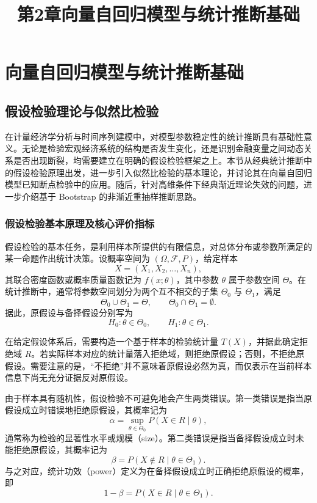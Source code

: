 \documentclass[UTF8,a4paper,12pt]{ctexbook}
\title{第2章\quad 向量自回归模型与统计推断基础}
\author{}
\date{}
\begin{document}
\maketitle

\setcounter{chapter}{1}
\chapter{向量自回归模型与统计推断基础}
\setcounter{section}{2}

\section{假设检验理论与似然比检验}

在计量经济学分析与时间序列建模中，对模型参数稳定性的统计推断具有基础性意义。无论是检验宏观经济系统的结构是否发生变化，还是识别金融变量之间动态关系是否出现断裂，均需要建立在明确的假设检验框架之上。本节从经典统计推断中的假设检验原理出发，进一步引入似然比检验的基本理论，并讨论其在向量自回归模型已知断点检验中的应用。随后，针对高维条件下经典渐近理论失效的问题，进一步介绍基于 Bootstrap 的非渐近重抽样推断思路。

\subsection{假设检验基本原理及核心评价指标}

假设检验的基本任务，是利用样本所提供的有限信息，对总体分布或参数所满足的某一命题作出统计决策。设概率空间为 $(\Omega,\mathcal{F},P)$，给定样本
\begin{equation}
X=(X_1,X_2,\dots,X_n),
\end{equation}
其联合密度函数或概率质量函数记为 $f(x;\theta)$，其中参数 $\theta$ 属于参数空间 $\Theta$。在统计推断中，通常将参数空间划分为两个互不相交的子集 $\Theta_0$ 与 $\Theta_1$，满足
\begin{equation}
\Theta_0\cup\Theta_1=\Theta, \qquad \Theta_0\cap\Theta_1=\emptyset.
\end{equation}
据此，原假设与备择假设分别写为
\begin{equation}
H_0: \theta\in\Theta_0, \qquad H_1: \theta\in\Theta_1.
\end{equation}

在给定假设体系后，需要构造一个基于样本的检验统计量 $T(X)$，并据此确定拒绝域 $R$。若实际样本对应的统计量落入拒绝域，则拒绝原假设；否则，不拒绝原假设。需要注意的是，“不拒绝”并不意味着原假设必然为真，而仅表示在当前样本信息下尚无充分证据反对原假设。

由于样本具有随机性，假设检验不可避免地会产生两类错误。第一类错误是指当原假设成立时错误地拒绝原假设，其概率记为
\begin{equation}
\alpha = \sup_{\theta\in\Theta_0} P(X\in R\mid \theta),
\end{equation}
通常称为检验的显著性水平或规模（size）。第二类错误是指当备择假设成立时未能拒绝原假设，其概率记为
\begin{equation}
\beta = P(X\notin R\mid \theta\in\Theta_1).
\end{equation}
与之对应，统计功效（power）定义为在备择假设成立时正确拒绝原假设的概率，即
\begin{equation}
1-\beta = P(X\in R\mid \theta\in\Theta_1).
\end{equation}
\end{document}
